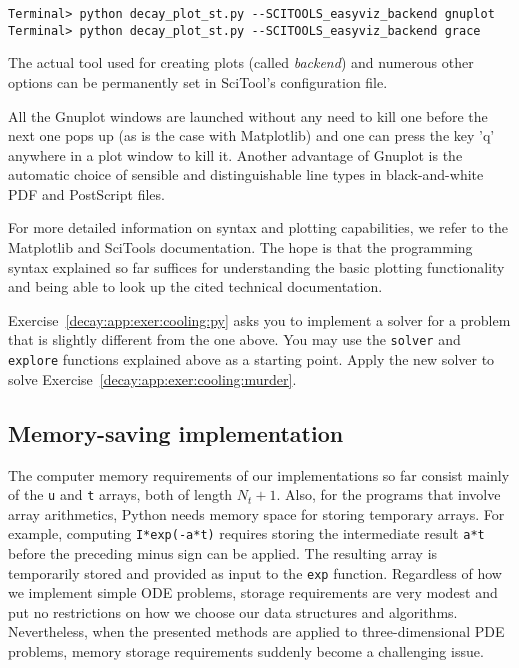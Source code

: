 \documentclass[graybox,sectrefs,envcountresetchap,open=right,final]{svmonodo}
\newenvironment{question_mdfboxadmon}[1][]{
\begin{question_mdfboxmdframed}[frametitle=#1]
}
{
\end{question_mdfboxmdframed}
}
\begin{document}
\begin{Verbatim}[frame=lines,label=\fbox{{\tiny Terminal}},framesep=2.5mm,framerule=0.7pt,fontsize=\fontsize{9pt}{9pt}]
Terminal> python decay_plot_st.py --SCITOOLS_easyviz_backend gnuplot
Terminal> python decay_plot_st.py --SCITOOLS_easyviz_backend grace

\end{Verbatim}

The actual tool used for creating plots (called \emph{backend})
and numerous other options
can be permanently set in SciTool's configuration file.

All the Gnuplot windows are launched without any need to kill one before
the next one pops up (as is the case with Matplotlib) and one can
press the key 'q' anywhere in a plot window to kill it.
Another advantage of Gnuplot is the automatic choice of sensible
and distinguishable line types in black-and-white PDF and PostScript
files.

For more detailed information on syntax and plotting capabilities,
we refer to the Matplotlib \cite{Matplotlib:doc}
and SciTools \cite{SciTools:doc} documentation.
The hope is that
the programming syntax explained so far suffices for understanding the
basic plotting functionality and being able to look up
the cited technical documentation.


\begin{question_mdfboxadmon}
Exercise~\ref{decay:app:exer:cooling:py} asks you to implement
a solver for a problem that is slightly different from the
one above. You may use the \texttt{solver} and \texttt{explore} functions
explained above as a starting point. Apply the new solver
to solve Exercise~\ref{decay:app:exer:cooling:murder}.
\end{question_mdfboxadmon} %



\subsection{Memory-saving implementation}

The computer memory requirements of our implementations so far consist
mainly of the \texttt{u} and \texttt{t} arrays, both of length $N_t+1$.  Also, for
the programs that involve array arithmetics, Python needs memory space
for storing temporary arrays. For example, computing \texttt{I*exp(-a*t)}
requires storing the intermediate result \texttt{a*t} before the preceding
minus sign can be applied. The resulting array is temporarily stored
and provided as input to the \texttt{exp} function.  Regardless of how we
implement simple ODE problems, storage requirements are very modest
and put no restrictions on how we choose our data structures and
algorithms.  Nevertheless, when the presented methods are applied to
three-dimensional PDE problems, memory storage requirements suddenly
become a challenging issue.
\end{document}
